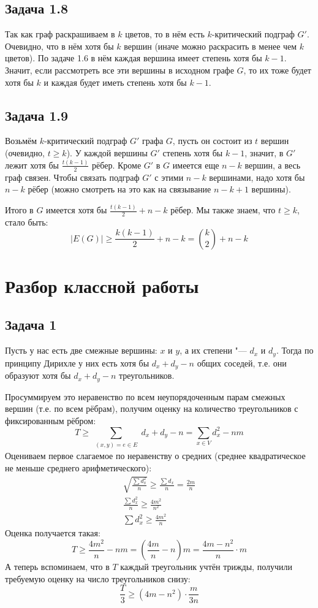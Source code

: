 \subsection{Задача 1.8}
	Так как граф раскрашиваем в $k$ цветов, то в нём есть $k$-критический подграф $G'$.
	Очевидно, что в нём хотя бы $k$ вершин (иначе можно раскрасить в менее чем $k$ цветов).
	По задаче 1.6 в нём каждая вершина имеет степень хотя бы $k-1$.
	Значит, если рассмотреть все эти вершины в исходном графе $G$, то их тоже будет
	хотя бы $k$ и каждая будет иметь степень хотя бы $k-1$.

\subsection{Задача 1.9}
	Возьмём $k$-критический подграф $G'$ графа $G$, пусть он состоит из $t$ вершин
	(очевидно, $t \ge k$).
	У каждой вершины $G'$ степень хотя бы $k-1$, значит, в $G'$ лежит хотя бы $\frac{t(k-1)}{2}$ рёбер.
	Кроме $G'$ в $G$ имеется еще $n-k$ вершин, а весь граф связен.
	Чтобы связать подграф $G'$ с этими $n-k$ вершинами, надо хотя бы $n-k$ рёбер
	(можно смотреть на это как на связывание $n-k+1$ вершины).

	Итого в $G$ имеется хотя бы $\frac{t(k-1)}{2}+n-k$ рёбер.
	Мы также знаем, что $t\ge k$, стало быть:
	\[
		|E(G)| \ge \frac{k(k-1)}{2} + n - k = \binom{k}{2} + n - k
	\]

\section{Разбор классной работы}
\subsection{Задача 1}
	Пусть у нас есть две смежные вершины: $x$ и $y$, а их степени "--- $d_x$ и $d_y$.
	Тогда по принципу Дирихле у них есть хотя бы $d_x + d_y - n$ общих соседей,
	т.е. они образуют хотя бы $d_x + d_y - n$ треугольников.

	Просуммируем это неравенство по всем неупорядоченным парам смежных вершин (т.е. по всем рёбрам),
	получим оценку на количество треугольников с фиксированным рёбром:
	\[
		T \ge \sum_{\substack{(x, y)=e \in E}} d_x + d_y - n = \sum_{x \in V} d_x^2 - nm
	\]
	Оцениваем первое слагаемое по неравенству о средних (среднее квадратическое не меньше среднего арифметического):
	\begin{gather*}
		\label{day150416_class_prob1_ineq}
		\sqrt{\frac{\sum d_x^2}{n}} \ge \frac{\sum d_x}{n} = \frac{2m}{n} \\
		\frac{\sum d_x^2}{n} \ge \frac{4m^2}{n^2} \\
		\sum d_x^2 \ge \frac{4m^2}{n}
	\end{gather*}
	Оценка получается такая:
	\[
		T \ge \frac{4m^2}{n} - nm = \left(\frac{4m}{n}-n\right)m = \frac{4m-n^2}{n} \cdot m
	\]
	А теперь вспоминаем, что в $T$ каждый треугольник учтён трижды, получили требуемую оценку на число треугольников снизу:
	\[ \frac{T}{3} \ge (4m-n^2) \cdot \frac{m}{3n} \]

